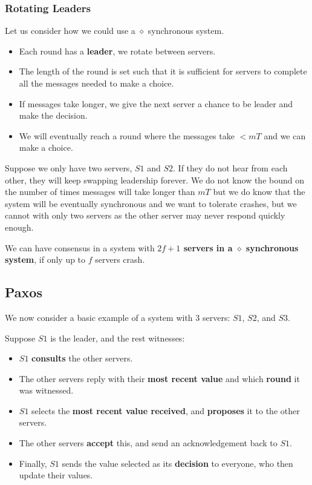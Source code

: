 \documentclass[11pt]{article}
\begin{document}
\subsubsection{Rotating Leaders}
Let us consider how we could use a $\diamond$ synchronous system.

\begin{itemize}
  \item Each round has a \textbf{leader}, we rotate between servers.
  \item The length of the round is set such that it is sufficient for servers to complete all the messages needed to make a choice.
  \item If messages take longer, we give the next server a chance to be leader and make the decision.
  \item We will eventually reach a round where the messages take $< mT$ and we can make a choice.
\end{itemize}

Suppose we only have two servers, $S1$ and $S2$.
If they do not hear from each other, they will keep swapping leadership forever.
We do not know the bound on the number of times messages will take longer than $mT$ but we do know that the system will be eventually synchronous and we want to tolerate crashes, but we cannot with only two servers as the other server may never respond quickly enough.

We can have consensus in a system with \textbf{$2f + 1$ servers in a $\diamond$ synchronous system}, if only up to $f$ servers crash.

\subsection{Paxos}
We now consider a basic example of a system with 3 servers: $S1$, $S2$, and $S3$.

Suppose $S1$ is the leader, and the rest witnesses:
\begin{itemize}
  \item $S1$ \textbf{consults} the other servers.
  \item The other servers reply with their \textbf{most recent value} and which \textbf{round} it was witnessed.
  \item $S1$ selects the \textbf{most recent value received}, and \textbf{proposes} it to the other servers.
  \item The other servers \textbf{accept} this, and send an acknowledgement back to $S1$.
  \item Finally, $S1$ sends the value selected as its \textbf{decision} to everyone, who then update their values.
\end{itemize}
\end{document}
